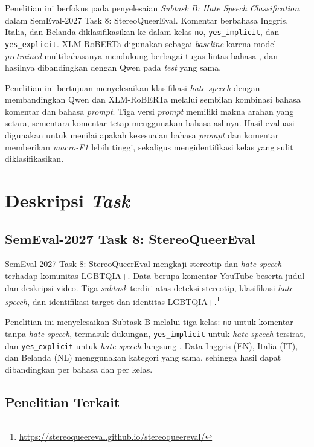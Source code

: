 \documentclass[11pt]{article}
\begin{document}
Penelitian ini berfokus pada penyelesaian \textit{Subtask B: Hate Speech Classification} dalam SemEval-2027 Task 8: StereoQueerEval. Komentar berbahasa Inggris, Italia, dan Belanda diklasifikasikan ke dalam kelas \texttt{no}, \texttt{yes\_implicit}, dan \texttt{yes\_explicit}. XLM-RoBERTa digunakan sebagai \textit{baseline} karena model \textit{pretrained} multibahasanya mendukung berbagai tugas lintas bahasa \citep{conneau-etal-2020-unsupervised}, dan hasilnya dibandingkan dengan Qwen pada \textit{test} yang sama.

Penelitian ini bertujuan menyelesaikan klasifikasi \textit{hate speech} dengan membandingkan Qwen dan XLM-RoBERTa melalui sembilan kombinasi bahasa komentar dan bahasa \textit{prompt}. Tiga versi \textit{prompt} memiliki makna arahan yang setara, sementara komentar tetap menggunakan bahasa aslinya. Hasil evaluasi digunakan untuk menilai apakah kesesuaian bahasa \textit{prompt} dan komentar memberikan \textit{macro-F1} lebih tinggi, sekaligus mengidentifikasi kelas yang sulit diklasifikasikan.

\section{Deskripsi \textit{Task}}
\subsection{SemEval-2027 Task 8: StereoQueerEval}
\label{subsec:task-description}

SemEval-2027 Task 8: StereoQueerEval mengkaji stereotip dan \textit{hate speech} terhadap komunitas LGBTQIA+. Data berupa komentar YouTube beserta judul dan deskripsi video. Tiga \textit{subtask} terdiri atas deteksi stereotip, klasifikasi \textit{hate speech}, dan identifikasi target dan identitas LGBTQIA+.\footnote{\url{https://stereoqueereval.github.io/stereoqueereval/}}

Penelitian ini menyelesaikan Subtask B melalui tiga kelas: \texttt{no} untuk komentar tanpa \textit{hate speech}, termasuk dukungan, \nolinkurl{yes_implicit} untuk \textit{hate speech} tersirat, dan \nolinkurl{yes_explicit} untuk \textit{hate speech} langsung \citep{stereoqueereval-2026-data}. Data Inggris (EN), Italia (IT), dan Belanda (NL) menggunakan kategori yang sama, sehingga hasil dapat dibandingkan per bahasa dan per kelas.

\subsection{Penelitian Terkait}
\label{subsec:related}
\end{document}
